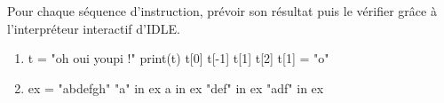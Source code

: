 Pour chaque séquence d'instruction, prévoir son résultat puis le vérifier grâce à l'interpréteur interactif d'IDLE.

\begin{enumerate}[label=\emph{\alph*)}]
\item 
\begin{pyverbatim}
t = "oh oui youpi !"
print(t)
t[0]
t[-1]
t[1]
t[2]
t[1] = "o" 
\end{pyverbatim}
\item 
\begin{pyverbatim}
ex = "abdefgh"
"a" in ex
a in ex
"def" in ex
"adf" in ex
\end{pyverbatim}
\end{enumerate}